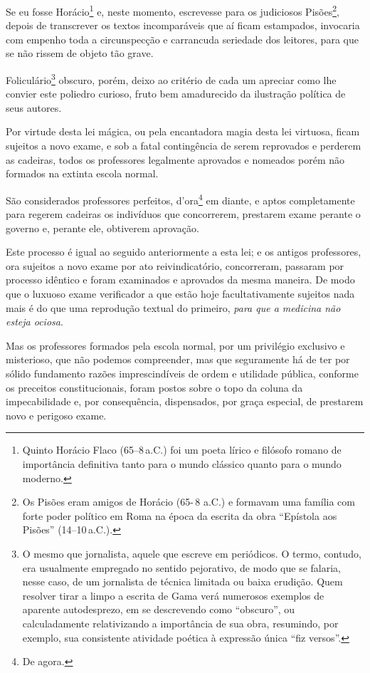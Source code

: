 Se eu fosse Horácio\footnote{Quinto Horácio Flaco (65--8\,a.C.) foi
  um poeta lírico e filósofo romano de importância definitiva tanto para
  o mundo clássico quanto para o mundo moderno.} e, neste momento,
escrevesse para os judiciosos Pisões\footnote{Os Pisões eram amigos de
  Horácio (65-\,8 a.C.) e formavam uma família com forte poder
  político em Roma na época da escrita da obra ``Epístola aos Pisões''
  (14--10\,a.C.).}, depois de transcrever os textos incomparáveis que aí
ficam estampados, invocaria com empenho toda a circunspecção e
carrancuda seriedade dos leitores, para que se não rissem de objeto tão
grave.

Foliculário\footnote{O mesmo que jornalista, aquele que escreve em
  periódicos. O termo, contudo, era usualmente empregado no sentido
  pejorativo, de modo que se falaria, nesse caso, de um jornalista de
  técnica limitada ou baixa erudição. Quem resolver tirar a limpo a
  escrita de Gama verá numerosos exemplos de aparente autodesprezo, em
  se descrevendo como ``obscuro'', ou calculadamente relativizando a
  importância de sua obra, resumindo, por exemplo, sua consistente
  atividade poética à expressão única ``fiz versos''.} obscuro, porém,
deixo ao critério de cada um apreciar como lhe convier este poliedro
curioso, fruto bem amadurecido da ilustração política de seus autores.

Por virtude desta lei mágica, ou pela encantadora magia desta lei
virtuosa, ficam sujeitos a novo exame, e sob a fatal contingência de
serem reprovados e perderem as cadeiras, todos os professores legalmente
aprovados e nomeados porém não formados na extinta escola normal.

São considerados professores perfeitos, d'ora\footnote{De agora.} em
diante, e aptos completamente para regerem cadeiras os indivíduos que
concorrerem, prestarem exame perante o governo e, perante ele, obtiverem
aprovação.

Este processo é igual ao seguido anteriormente a esta lei; e os antigos
professores, ora sujeitos a novo exame por ato reivindicatório,
concorreram, passaram por processo idêntico e foram examinados e
aprovados da mesma maneira. De modo que o luxuoso exame verificador a
que estão hoje facultativamente sujeitos nada mais é do que uma
reprodução textual do primeiro, \emph{para que a medicina não esteja
ociosa}.

Mas os professores formados pela escola normal, por um privilégio
exclusivo e misterioso, que não podemos compreender, mas que seguramente
há de ter por sólido fundamento razões imprescindíveis de ordem e
utilidade pública, conforme os preceitos constitucionais, foram postos
sobre o topo da coluna da impecabilidade e, por consequência,
dispensados, por graça especial, de prestarem novo e perigoso exame.


